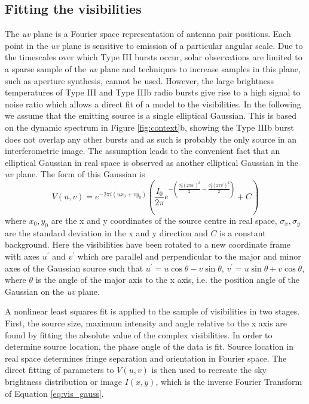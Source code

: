 \subsection{Fitting the visibilities}
\label{sec:vis_fit}
The \textit{uv} plane is a Fourier space representation of antenna pair positions. Each point in the \textit{uv} plane is sensitive to emission of a particular angular scale. Due to the timescales over which Type III bursts occur, solar observations are limited to a sparse sample of the \textit{uv} plane and techniques to increase samples in this plane, such as aperture synthesis, cannot be used. However, the large brightness temperatures of Type III and Type IIIb radio bursts \citep{Reid2014} give rise to a  high signal to noise ratio which allows a direct fit of a model to the visibilities.
In the following we assume that the emitting source is a single elliptical Gaussian. This is based on the dynamic spectrum in Figure \ref{fig:context}b, showing the Type IIIb burst does not overlap any other bursts and as such is probably the only source in an interferometric image. The assumption leads to the convenient fact that an elliptical Gaussian in real space is observed as another elliptical Gaussian in the \textit{uv} plane. The form of this Gaussian is
\begin{equation}
V(u,v) = e^{-2\pi i(ux_0+vy_0)} \left( \frac{I_0}{2\pi} e^{-\left(\frac{\sigma_x^2(2\pi u^\prime)^2}{2}-\frac{\sigma_y^2(2\pi v^\prime)^2}{2}\right)} + C \right)
\label{eq:vis_gauss}
\end{equation}
where $x_0, y_0$ are the x and y coordinates of the source centre in real space, $\sigma_x, \sigma_y$ are the standard deviation in the x and y direction and $C$ is a constant background. Here the visibilities have been rotated to a new coordinate frame with axes $u^\prime$ and $v^\prime$ which are parallel and perpendicular to the major and minor axes of the Gaussian source such that $u^\prime = u\cos{\theta} - v\sin{\theta} \mbox{, } v^\prime = u\sin{\theta} + v\cos{\theta}$,  where $\theta$ is the angle of the major axis to the x axis, i.e. the position angle of the Gaussian on the \textit{uv} plane.

A nonlinear least squares fit is applied to the sample of visibilities in two stages. First, the source size, maximum intensity and angle relative to the x axis are found by fitting the absolute value of the complex visibilities.
In order to determine source location, the phase angle of the data is fit. Source location in real space determines fringe separation and orientation in Fourier space. The direct fitting of parameters to \textbf{$V(u,v)$} is then used to recreate the sky brightness distribution or image \textbf{$I(x,y)$}, which is the inverse Fourier Transform of Equation \ref{eq:vis_gauss}.


